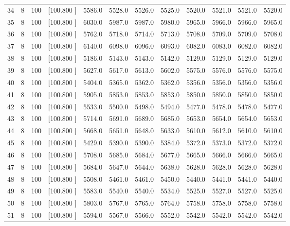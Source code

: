 \documentclass[12pt,a4paper]{article}
\begin{document}
\begin{center}
{\begin{tabular}{r r r r r r r r r r r r}
  34&  8&100&[100.800   ]&  5586.0&  5528.0&  5526.0&  5525.0&  5520.0&  5521.0&  5521.0&  5520.0\\[-0.02in]
  35&  8&100&[100.800   ]&  6030.0&  5987.0&  5987.0&  5980.0&  5965.0&  5966.0&  5966.0&  5965.0\\[-0.02in]
  36&  8&100&[100.800   ]&  5762.0&  5718.0&  5714.0&  5713.0&  5708.0&  5709.0&  5709.0&  5708.0\\[-0.02in]
  37&  8&100&[100.800   ]&  6140.0&  6098.0&  6096.0&  6093.0&  6082.0&  6083.0&  6082.0&  6082.0\\[-0.02in]
  38&  8&100&[100.800   ]&  5186.0&  5143.0&  5143.0&  5142.0&  5129.0&  5129.0&  5129.0&  5129.0\\[-0.02in]
  39&  8&100&[100.800   ]&  5627.0&  5617.0&  5613.0&  5602.0&  5575.0&  5576.0&  5576.0&  5575.0\\[-0.02in]
  40&  8&100&[100.800   ]&  5404.0&  5365.0&  5362.0&  5362.0&  5356.0&  5356.0&  5356.0&  5356.0\\[-0.02in]
  41&  8&100&[100.800   ]&  5905.0&  5853.0&  5853.0&  5853.0&  5850.0&  5850.0&  5850.0&  5850.0\\[-0.02in]
  42&  8&100&[100.800   ]&  5533.0&  5500.0&  5498.0&  5494.0&  5477.0&  5478.0&  5478.0&  5477.0\\[-0.02in]
  43&  8&100&[100.800   ]&  5714.0&  5691.0&  5689.0&  5685.0&  5653.0&  5654.0&  5654.0&  5653.0\\[-0.02in]
  44&  8&100&[100.800   ]&  5668.0&  5651.0&  5648.0&  5633.0&  5610.0&  5612.0&  5610.0&  5610.0\\[-0.02in]
  45&  8&100&[100.800   ]&  5429.0&  5390.0&  5390.0&  5384.0&  5372.0&  5373.0&  5372.0&  5372.0\\[-0.02in]
  46&  8&100&[100.800   ]&  5708.0&  5685.0&  5684.0&  5677.0&  5665.0&  5666.0&  5666.0&  5665.0\\[-0.02in]
  47&  8&100&[100.800   ]&  5684.0&  5647.0&  5644.0&  5638.0&  5628.0&  5628.0&  5628.0&  5628.0\\[-0.02in]
  48&  8&100&[100.800   ]&  5508.0&  5461.0&  5461.0&  5450.0&  5440.0&  5441.0&  5441.0&  5440.0\\[-0.02in]
  49&  8&100&[100.800   ]&  5583.0&  5540.0&  5540.0&  5534.0&  5525.0&  5527.0&  5527.0&  5525.0\\[-0.02in]
  50&  8&100&[100.800   ]&  5803.0&  5767.0&  5765.0&  5764.0&  5758.0&  5758.0&  5758.0&  5758.0\\[-0.02in]
  51&  8&100&[100.800   ]&  5594.0&  5567.0&  5566.0&  5552.0&  5542.0&  5542.0&  5542.0&  5542.0\\[-0.02in]

\end{tabular}}
\end{center}
\end{document}
